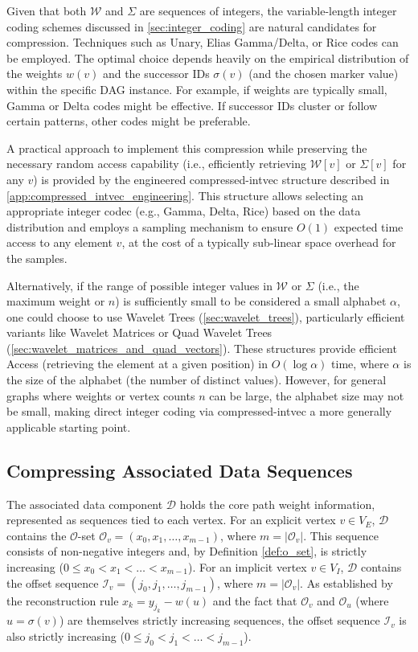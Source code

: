 Given that both $\mathcal{W}$ and $\Sigma$ are sequences of integers, the variable-length integer coding schemes discussed in \autoref{sec:integer_coding} are natural candidates for compression. Techniques such as Unary, Elias Gamma/Delta, or Rice codes can be employed. The optimal choice depends heavily on the empirical distribution of the weights $w(v)$ and the successor IDs $\sigma(v)$ (and the chosen marker value) within the specific DAG instance. For example, if weights are typically small, Gamma or Delta codes might be effective. If successor IDs cluster or follow certain patterns, other codes might be preferable.

A practical approach to implement this compression while preserving the necessary random access capability (i.e., efficiently retrieving $\mathcal{W}[v]$ or $\Sigma[v]$ for any $v$) is provided by the engineered \textsf{compressed-intvec} structure described in \autoref{app:compressed_intvec_engineering}. This structure allows selecting an appropriate integer codec (e.g., Gamma, Delta, Rice) based on the data distribution and employs a sampling mechanism to ensure $O(1)$ expected time access to any element $v$, at the cost of a typically sub-linear space overhead for the samples.

Alternatively, if the range of possible integer values in $\mathcal{W}$ or $\Sigma$ (i.e., the maximum weight or $n$) is sufficiently small to be considered a small alphabet $\alpha$, one could choose to use Wavelet Trees (\autoref{sec:wavelet_trees}), particularly efficient variants like Wavelet Matrices or Quad Wavelet Trees (\autoref{sec:wavelet_matrices_and_quad_vectors}). These structures provide efficient Access (retrieving the element at a given position) in $O(\log \alpha)$ time, where $\alpha$ is the size of the alphabet (the number of distinct values). However, for general graphs where weights or vertex counts $n$ can be large, the alphabet size may not be small, making direct integer coding via \textsf{compressed-intvec} a more generally applicable starting point.

\subsection{Compressing Associated Data Sequences}
\label{subsec:compressing_associated_data_sequences}

The associated data component $\mathcal{D}$ holds the core path weight information, represented as sequences tied to each vertex. For an explicit vertex $v \in V_E$, $\mathcal{D}$ contains the $\mathcal{O}$-set $\mathcal{O}_v = (x_0, x_1, \dots, x_{m-1})$, where $m = |\mathcal{O}_v|$. This sequence consists of non-negative integers and, by Definition \ref{def:o_set}, is strictly increasing ($0 \le x_0 < x_1 < \dots < x_{m-1}$).
For an implicit vertex $v \in V_I$, $\mathcal{D}$ contains the offset sequence $\mathcal{I}_v = (j_0, j_1, \dots, j_{m-1})$, where $m = |\mathcal{O}_v|$. As established by the reconstruction rule $x_k = y_{j_k} - w(u)$ and the fact that $\mathcal{O}_v$ and $\mathcal{O}_u$ (where $u=\sigma(v)$) are themselves strictly increasing sequences, the offset sequence $\mathcal{I}_v$ is also strictly increasing ($0 \le j_0 < j_1 < \dots < j_{m-1}$).


